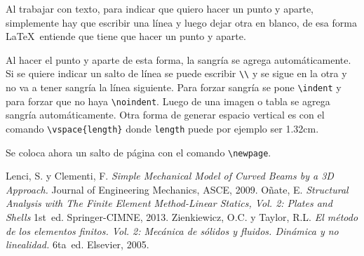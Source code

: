 \documentclass[a4paper,12pt]{article} %
\begin{document}
	Al trabajar con texto, para indicar que quiero hacer un punto y aparte, simplemente hay que escribir una línea y luego dejar otra en blanco, de esa forma \LaTeX ~entiende que tiene que hacer un punto y aparte. 


	Al hacer el punto y aparte de esta forma, la sangría se agrega automáticamente. Si se quiere indicar un salto de línea se puede escribir \verb|\\| y se sigue en la otra y no va a tener sangría la línea siguiente. Para forzar sangría se pone \verb|\indent| y para forzar que no haya \verb|\noindent|. Luego de una imagen o tabla se agrega sangría automáticamente. Otra forma de generar espacio vertical es con el comando \verb|\vspace{length}| donde \verb|length| puede por ejemplo ser 1.32cm.
	
	\vspace{1.32cm}
	
	Se coloca ahora un salto de página con el comando \verb|\newpage|.
	
	\newpage
	


\begin{thebibliography}{5} %
\thispagestyle{empty}
%
Lenci, S. y Clementi, F. \emph{Simple Mechanical Model of Curved Beams by a 3D Approach.} \relax Journal of Engineering Mechanics, ASCE, 2009.
%
Oñate, E. \emph{Structural Analysis with The Finite Element Method-Linear Statics,
Vol. 2: Plates and Shells} 1st~ed. \relax Springer-CIMNE, 2013.
%
Zienkiewicz, O.C. y Taylor, R.L. \emph{El método de los elementos finitos. Vol. 2: Mecánica de sólidos y fluidos. Dinámica y no linealidad.} 6ta~ed. \relax Elsevier, 2005.
%
\end{thebibliography}
\end{document}
